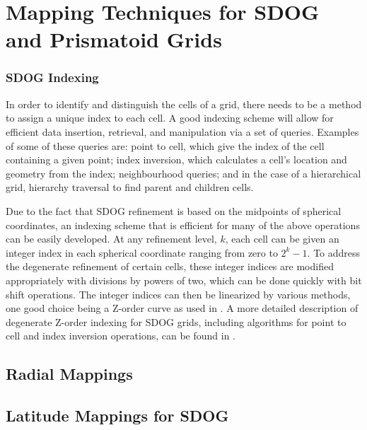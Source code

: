 \chapter{Mapping Techniques for SDOG and Prismatoid Grids} \label{chap:mapping}

\subsection{SDOG Indexing} \label{sec:sdog-indexing}
In order to identify and distinguish the cells of a grid, there needs to be a method to assign a unique index to each cell.
A good indexing scheme will allow for efficient data insertion, retrieval, and manipulation via a set of queries.
Examples of some of these queries are: point to cell, which give the index of the cell containing a given point; index inversion, which calculates a cell's location and geometry from the index; neighbourhood queries; and in the case of a hierarchical grid, hierarchy traversal to find parent and children cells.


Due to the fact that SDOG refinement is based on the midpoints of spherical coordinates, an indexing scheme that is efficient for many of the above operations can be easily developed.
At any refinement level, $k$, each cell can be given an integer index in each spherical coordinate ranging from zero to $2^{k} - 1$.
To address the degenerate refinement of certain cells, these integer indices are modified appropriately with divisions by powers of two, which can be done quickly with bit shift operations.
The integer indices can then be linearized by various methods, one good choice being a Z-order curve \cite{morton1966computer} as used in \cite{yu2009sdog}.
A more detailed description of degenerate Z-order indexing for SDOG grids, including algorithms for point to cell and index inversion operations, can be found in \cite{yu2009coding}.


\section{Radial Mappings}
\section{Latitude Mappings for SDOG}

